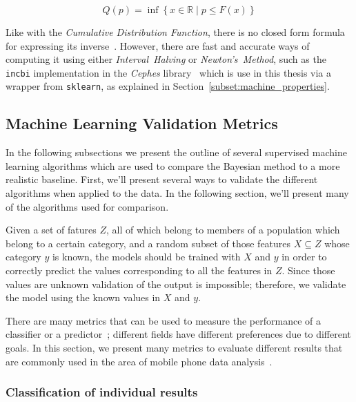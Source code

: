 \begin{equation}
\label{eq:quantile_function}
Q \left( p \right)  = \inf \left\{ x \in \mathbb{R} \mid p \leq F \left( x \right)  \right\}
\end{equation}

Like with the \emph{Cumulative Distribution Function}, there is no closed form formula for expressing its inverse~\cite{kippingexoplanets2013}. However, there are fast and accurate ways of computing it using either \emph{Interval~Halving} or \emph{Newton's~Method}, such as the \texttt{incbi} implementation in the \emph{Cephes} library~\cite{cephes} which is use in this thesis via a wrapper from \texttt{sklearn}, as explained in Section~\ref{subset:machine_properties}.

\subsection{Machine Learning Validation Metrics}
\label{subsec:mlmetrics}

In the following subsections we present the outline of several supervised machine learning algorithms which are used to compare the Bayesian method to a more realistic baseline. First, we'll present several ways to validate the different algorithms when applied to the data. In the following section, we'll present many of the algorithms used for comparison.

Given a set of fatures $Z$, all of which belong to members of a population which belong to a certain category, and a random subset of those features $X \subseteq Z$ whose category $y$ is known, the models should be trained with $X$ and $y$ in order to correctly predict the values corresponding to all the features in $Z$. Since those values are unknown validation of the output is impossible; therefore, we validate the model using the known values in $X$ and $y$.

There are many metrics that can be used to measure the performance of a classifier or a predictor~\cite{binaryevaluation}; different fields have different preferences due to different goals. In this section, we present many metrics to evaluate different results that are commonly used in the area of mobile phone data analysis~\cite{oskardottir2016}.

\subsubsection{Classification of individual results}

